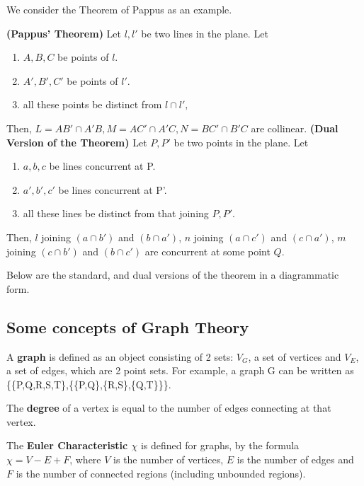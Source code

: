 \documentclass{article}
\begin{document}
\noindent We consider the Theorem of Pappus as an example.
\begin{Theor}
    \textbf{(Pappus' Theorem)} Let $l,l'$ be two lines in the plane. Let
    \begin{enumerate}
        \item $A,B,C$ be points of $l$.
        \item $A',B',C'$ be points of $l'$.
        \item all these points be distinct from $l \cap l',$
    \end{enumerate}
    Then, $L = AB' \cap A'B, M = AC' \cap A'C, N = BC' \cap B'C$ are collinear.
    \newline
    \text{ }\newline
    \textbf{(Dual Version of the Theorem)} Let $P,P'$ be two points in the plane. Let
    \begin{enumerate}
        \item $a,b,c$ be lines concurrent at P.
        \item $a',b',c'$ be lines concurrent at P'.
        \item all these lines be distinct from that joining $P,P'.$  
    \end{enumerate}
    Then, $l$ joining $(a \cap b')$ and $(b \cap a')$, $n$ joining $(a \cap c')$ and $(c \cap a')$, $m$ joining $(c \cap b')$ and $(b \cap c')$ are concurrent at some point $Q$.
\end{Theor}
Below are the standard, and dual versions of the theorem in a diagrammatic form.

\subsection{Some concepts of Graph Theory}

\begin{defin}
    A \textbf{graph} is defined as an object consisting of 2 sets: $V_G$, a set of vertices and $V_E$, a set of edges, which are 2 point sets.\newline
    For example, a graph G can be written as \{\{P,Q,R,S,T\},\{\{P,Q\},\{R,S\},\{Q,T\}\}\}.
\end{defin}
\begin{defin}
    The \textbf{degree} of a vertex is equal to the number of edges connecting at that vertex.
\end{defin}
\begin{defin}
    The \textbf{Euler Characteristic $\chi$} is defined for graphs, by the formula $\chi = V - E + F$, where $V$ is the number of vertices, $E$ is the number of edges and $F$ is the number of connected regions (including unbounded regions).
\end{defin}
\end{document}
